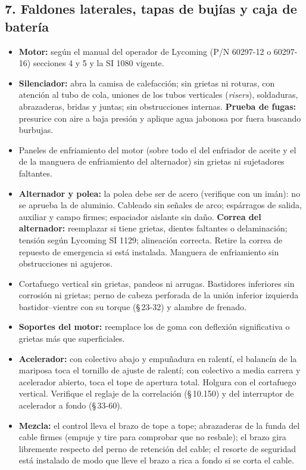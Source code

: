\subsection*{7. Faldones laterales, tapas de bujías y caja de batería}
\begin{itemize}
\item \textbf{Motor:} según el manual del operador de Lycoming (P/N 60297-12 o 60297-16) secciones 4 y 5 y la SI 1080 vigente.
\item \textbf{Silenciador:} abra la camisa de calefacción; sin grietas ni roturas, con atención al tubo de cola, uniones de los tubos verticales (\emph{risers}), soldaduras, abrazaderas, bridas y juntas; sin obstrucciones internas. \textbf{Prueba de fugas:} presurice con aire a baja presión y aplique agua jabonosa por fuera buscando burbujas.
\item Paneles de enfriamiento del motor (sobre todo el del enfriador de aceite y el de la manguera de enfriamiento del alternador) sin grietas ni sujetadores faltantes.
\item \textbf{Alternador y polea:} la polea debe ser de acero (verifique con un imán): no se aprueba la de aluminio. Cableado sin señales de arco; espárragos de salida, auxiliar y campo firmes; espaciador aislante sin daño. \textbf{Correa del alternador:} reemplazar si tiene grietas, dientes faltantes o delaminación; tensión según Lycoming SI 1129; alineación correcta. Retire la correa de repuesto de emergencia si está instalada. Manguera de enfriamiento sin obstrucciones ni agujeros.
\item Cortafuego vertical sin grietas, pandeos ni arrugas. Bastidores inferiores sin corrosión ni grietas; perno de cabeza perforada de la unión inferior izquierda bastidor--vientre con su torque (\S\,23-32) y alambre de frenado.
\item \textbf{Soportes del motor:} reemplace los de goma con deflexión significativa o grietas más que superficiales.
\item \textbf{Acelerador:} con colectivo abajo y empuñadura en ralentí, el balancín de la mariposa toca el tornillo de ajuste de ralentí; con colectivo a media carrera y acelerador abierto, toca el tope de apertura total. Holgura con el cortafuego vertical. Verifique el reglaje de la correlación (\S\,10.150) y del interruptor de acelerador a fondo (\S\,33-60).
\item \textbf{Mezcla:} el control lleva el brazo de tope a tope; abrazaderas de la funda del cable firmes (empuje y tire para comprobar que no resbale); el brazo gira libremente respecto del perno de retención del cable; el resorte de seguridad está instalado de modo que lleve el brazo a rica a fondo si se corta el cable.

\end{itemize}
